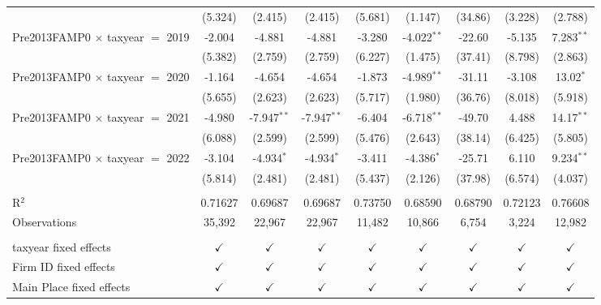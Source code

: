 \begin{tabular}{lcccccccc}
                                           & (5.324)       & (2.415)       & (2.415)       & (5.681)       & (1.147)        & (34.86)       & (3.228)        & (2.788)\\   
   Pre2013FAMP0 $\times$ taxyear $=$ 2019  & -2.004        & -4.881        & -4.881        & -3.280        & -4.022$^{**}$  & -22.60        & -5.135         & 7.283$^{**}$\\   
                                           & (5.382)       & (2.759)       & (2.759)       & (6.227)       & (1.475)        & (37.41)       & (8.798)        & (2.863)\\   
   Pre2013FAMP0 $\times$ taxyear $=$ 2020  & -1.164        & -4.654        & -4.654        & -1.873        & -4.989$^{**}$  & -31.11        & -3.108         & 13.02$^{*}$\\   
                                           & (5.655)       & (2.623)       & (2.623)       & (5.717)       & (1.980)        & (36.76)       & (8.018)        & (5.918)\\   
   Pre2013FAMP0 $\times$ taxyear $=$ 2021  & -4.980        & -7.947$^{**}$ & -7.947$^{**}$ & -6.404        & -6.718$^{**}$  & -49.70        & 4.488          & 14.17$^{**}$\\   
                                           & (6.088)       & (2.599)       & (2.599)       & (5.476)       & (2.643)        & (38.14)       & (6.425)        & (5.805)\\   
   Pre2013FAMP0 $\times$ taxyear $=$ 2022  & -3.104        & -4.934$^{*}$  & -4.934$^{*}$  & -3.411        & -4.386$^{*}$   & -25.71        & 6.110          & 9.234$^{**}$\\   
                                           & (5.814)       & (2.481)       & (2.481)       & (5.437)       & (2.126)        & (37.98)       & (6.574)        & (4.037)\\   
    \\
   R$^2$                                   & 0.71627       & 0.69687       & 0.69687       & 0.73750       & 0.68590        & 0.68790       & 0.72123        & 0.76608\\  
   Observations                            & 35,392        & 22,967        & 22,967        & 11,482        & 10,866         & 6,754         & 3,224          & 12,982\\  
    \\
   taxyear fixed effects                   & $\checkmark$  & $\checkmark$  & $\checkmark$  & $\checkmark$  & $\checkmark$   & $\checkmark$  & $\checkmark$   & $\checkmark$\\   
   Firm ID fixed effects                   & $\checkmark$  & $\checkmark$  & $\checkmark$  & $\checkmark$  & $\checkmark$   & $\checkmark$  & $\checkmark$   & $\checkmark$\\   
   Main Place fixed effects                & $\checkmark$  & $\checkmark$  & $\checkmark$  & $\checkmark$  & $\checkmark$   & $\checkmark$  & $\checkmark$   & $\checkmark$\\   
   \bottomrule
\end{tabular}
\par\endgroup
